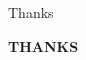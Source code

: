 \documentclass{beamer}
\begin{document}

	


	\begin{frame}{Thanks}
		\begin{center}
			{\Huge \textcolor{rossoPantano}{\textbf{THANKS}}}
		\end{center}
		
	\end{frame}
\end{document}
